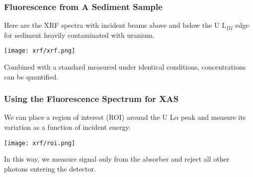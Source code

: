 \documentclass[10pt, xcolor=x11names, compress]{beamer}
\begin{document}
\begin{frame}
  \frametitle{Fluorescence from A Sediment Sample}
  \begin{center}
    Here are the XRF spectra with incident beams \alert{above} and
    {\color{Blue4}below} the U L$_{III}$ edge for sediment heavily
    contaminated with uranium.

    \texttt{[image: xrf/xrf.png]}
  \end{center}

  \begin{exampleblock}{}
    \begin{center}
      Combined with a standard measured under identical conditions,
      concentrations can be quantified.
    \end{center}
  \end{exampleblock}
\end{frame}
\begin{frame}
  \frametitle{Using the Fluorescence Spectrum for XAS}
  \begin{center}
    We can place a \alert{region of interest} (ROI) around the U
    L$\alpha$ peak and measure its variation as a function of incident
    energy.

    \texttt{[image: xrf/roi.png]}
  \end{center}

  \begin{exampleblock}{}
    \begin{center}
      In this way, we measure signal only from the absorber and reject
      all other photons entering the detector.
    \end{center}
  \end{exampleblock}
\end{frame}
\end{document}
